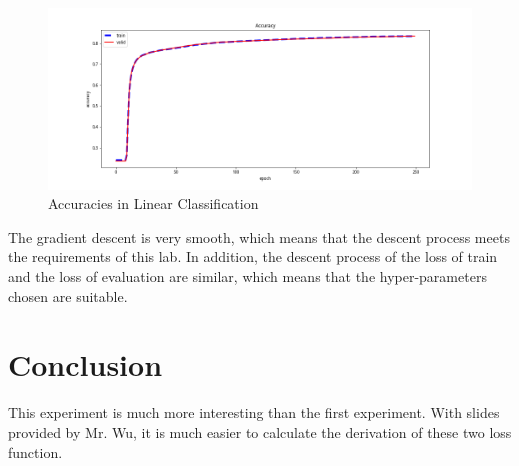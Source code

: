 \documentclass[journal, a4paper]{IEEEtran}
\begin{document}
    \begin{figure}[!hbt]
        \begin{center}
        \caption{Accuracies in Linear Classification}
        \label{fig:linear-acc}
        \includegraphics[width=\columnwidth]{../images/linear-classification-accuracy.png}
        \end{center}
    \end{figure}

    
    The gradient descent is very smooth, which means that the descent process meets the requirements of this lab. In addition, the descent process of the loss of train and the loss of evaluation are similar, which means that the hyper-parameters chosen are suitable.

\section{Conclusion}
	This experiment is much more interesting than the first experiment. With slides provided by Mr. Wu, it is much easier to calculate the derivation of these two loss function.


\end{document}
